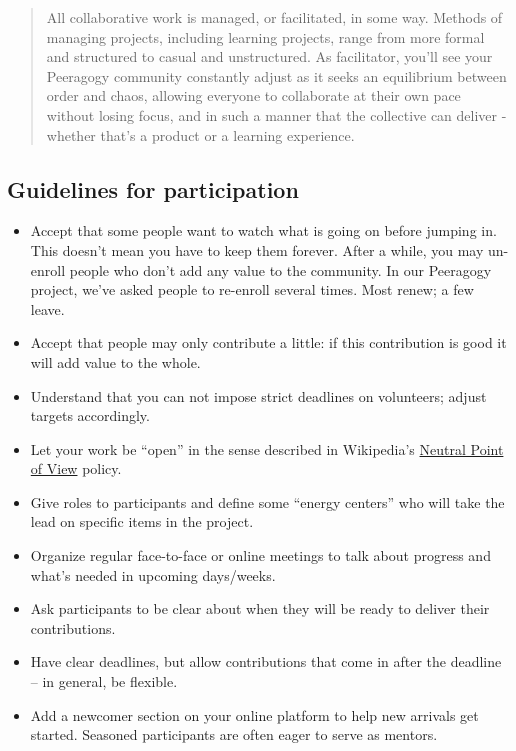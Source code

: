 \begin{quote}
All collaborative work is managed, or facilitated, in some way. Methods
of managing projects, including learning projects, range from more
formal and structured to casual and unstructured. As facilitator, you'll
see your Peeragogy community constantly adjust as it seeks an
equilibrium between order and chaos, allowing everyone to collaborate at
their own pace without losing focus, and in such a manner that the
collective can deliver - whether that's a product or a learning
experience.

\end{quote}
\subsection{Guidelines for participation}

\begin{itemize}
\item
  Accept that some people want to watch what is going on before jumping
  in. This doesn't mean you have to keep them forever. After a while,
  you may un-enroll people who don't add any value to the community. In
  our Peeragogy project, we've asked people to re-enroll several times.
  Most renew; a few leave.
\item
  Accept that people may only contribute a little: if this contribution
  is good it will add value to the whole.
\item
  Understand that you can not impose strict deadlines on volunteers;
  adjust targets accordingly.
\item
  Let your work be ``open'' in the sense described in Wikipedia's
  \href{http://en.wikipedia.org/wiki/Wikipedia:Neutral\_point\_of\_view}{Neutral
  Point of View} policy.
\item
  Give roles to participants and define some ``energy centers'' who will
  take the lead on specific items in the project.
\item
  Organize regular face-to-face or online meetings to talk about
  progress and what's needed in upcoming days/weeks.
\item
  Ask participants to be clear about when they will be ready to deliver
  their contributions.
\item
  Have clear deadlines, but allow contributions that come in after the
  deadline -- in general, be flexible.
\item
  Add a newcomer section on your online platform to help new arrivals
  get started. Seasoned participants are often eager to serve as
  mentors.
\end{itemize}

